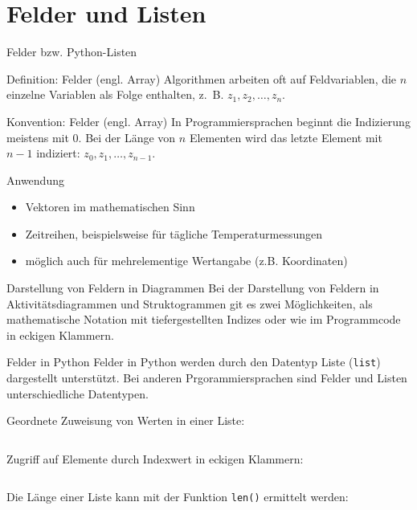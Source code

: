 \documentclass[xelatex,aspectratio=169]{beamer}
\begin{document}
\section{Felder und Listen}

\begin{frame}{Felder bzw. Python-Listen}
  \begin{block}{Definition: Felder (engl. Array)}
    Algorithmen arbeiten oft auf Feldvariablen, die \(n\) einzelne Variablen als Folge enthalten, z.~B. \( z_1, z_2, \ldots, z_n \).
  \end{block}

  \begin{block}{Konvention: Felder (engl. Array)}
    In Programmiersprachen beginnt die Indizierung meistens mit 0. Bei der Länge von \(n\) Elementen wird das letzte Element mit \(n-1\) indiziert: \( z_0 , z_1, \ldots, z_{n-1} \).
  \end{block}

  \begin{exampleblock}{Anwendung}
    \begin{itemize}
      \item Vektoren im mathematischen Sinn
      \item Zeitreihen, beispielsweise für tägliche Temperaturmessungen
      \item möglich auch für mehrelementige Wertangabe (z.B. Koordinaten)
    \end{itemize}
  \end{exampleblock}

\end{frame}

\begin{frame}{Darstellung von Feldern in Diagrammen}
  Bei der Darstellung von Feldern in Aktivitätsdiagrammen und Struktogrammen git es zwei Möglichkeiten, als mathematische Notation mit tiefergestellten Indizes oder wie im Programmcode in eckigen Klammern.

  \tiny\centering
  
\end{frame}

\begin{frame}{Felder in Python}
  Felder in Python werden durch den Datentyp Liste (\texttt{list}) dargestellt unterstützt. Bei anderen Prgorammiersprachen sind Felder und Listen unterschiedliche Datentypen.

  Geordnete Zuweisung von Werten in einer Liste:

  \inputminted[firstline=1, lastline=3]{python}{src/algorithmus_list.py}

  Zugriff auf Elemente durch Indexwert in eckigen Klammern:
  \inputminted[firstline=5, lastline=5]{python}{src/algorithmus_list.py}

  Die Länge einer Liste kann mit der Funktion \texttt{len()} ermittelt werden:
  \inputminted[firstline=7, lastline=7]{python}{src/algorithmus_list.py}
\end{frame}
\end{document}
